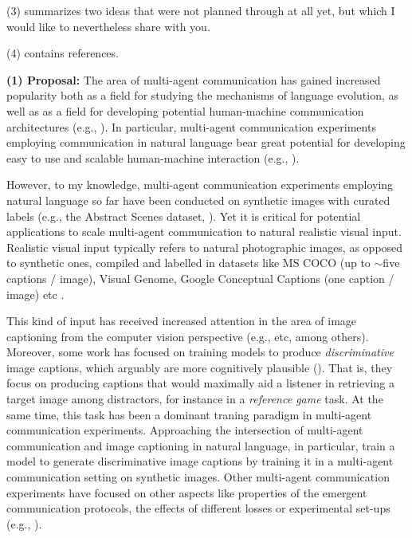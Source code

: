 \documentclass[11pt,letterpaper]{article}
\begin{document}
(3) summarizes two ideas that were not planned through at all yet, but which I would like to nevertheless share with you.

(4) contains references.\newline


\textbf{(1) Proposal:} The area of multi-agent communication has gained increased popularity both as a field for studying the mechanisms of language evolution, as well as as a field for developing potential human-machine communication architectures (e.g., \cite{lazaridou2020emergent}). In particular, multi-agent communication experiments employing communication in natural language bear great potential for developing easy to use and scalable human-machine interaction (e.g., \cite{andreas2016reasoning, mao2016generation, lazaridou2020multi, gupta2021dynamic}). 

However, to my knowledge, multi-agent communication experiments employing natural language so far have been conducted on synthetic images with curated labels (e.g., the Abstract Scenes dataset, \cite{zitnick2013bringing}). Yet it is critical for potential applications to scale multi-agent communication to natural realistic visual input. Realistic visual input typically refers to natural photographic images, as opposed to synthetic ones, compiled and labelled in datasets like MS COCO (up to $\sim$five captions / image), Visual Genome, Google Conceptual Captions (one caption / image) etc \cite{krishna2017visual, sharma2018conceptual, lin2014microsoft}. 

This kind of input has received increased attention in the area of image captioning from the computer vision perspective (e.g., \cite{kim2021vilt, su2019vl, lu2019vilbert} etc, among others). Moreover, some work has focused on training models to produce \textit{discriminative} image captions, which arguably are more cognitively plausible (\cite{andreas2016reasoning, dai2017contrastive, vedantam2017context, nie2020pragmatic}). That is, they focus on producing captions that would maximally aid a listener in retrieving a target image among distractors, for instance in a \textit{reference game} task. At the same time, this task has been a dominant traning paradigm in multi-agent communication experiments. Approaching the intersection of multi-agent communication and image captioning in natural language, in particular, \cite{lazaridou2020multi} train a model to generate discriminative image captions by training it in a multi-agent communication setting on synthetic images. Other multi-agent communication experiments have focused on other aspects like properties of the emergent communication protocols, the effects of different losses or experimental set-ups (e.g., \cite{lazaridou2018emergence, van2020grammar}).  
\end{document}
